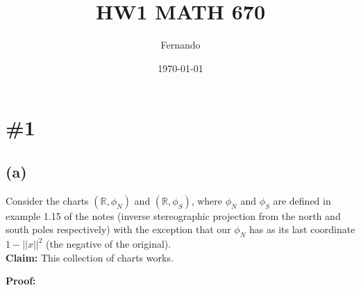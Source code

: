 \documentclass{article}
\begin{document}
\newcommand{\R}{\mathbb{R}}

\title{HW1 MATH 670}
\author{Fernando}
\date{\today}
\maketitle

\section*{\#1}
\subsection*{(a)}
Consider the charts $(\R,\phi_N)$ and
$(\R,\phi_S)$, where $\phi_N$ and $\phi_S$ are
defined in example 1.15 of the notes (inverse
stereographic projection from the north and south poles
respectively) with the exception that our $\phi_N$ has as its last coordinate
$1-||x||^2$ (the negative of the original).\\
\textbf{Claim:} This collection of charts
works.

\textbf{Proof:}
\end{document}
